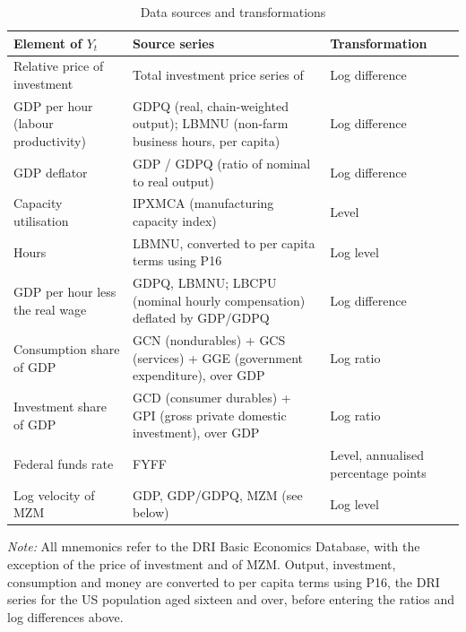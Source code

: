\documentclass[12pt, a4paper]{article}
\begin{document}
\begin{appendices}
\begin{table}[htpb]
    \centering
    \small
    \renewcommand{\arraystretch}{1.3}
    \caption{Data sources and transformations}
    \label{tab:data_sources}
    \begin{tabularx}{\linewidth}{p{3.3cm}Xp{3.1cm}}
    \toprule
    \textbf{Element of $Y_t$} & \textbf{Source series} & \textbf{Transformation} \\
    \midrule
    Relative price of investment & Total investment price series of \citet{Fisher2006} & Log difference \\
    GDP per hour (labour productivity) & GDPQ (real, chain-weighted output); LBMNU (non-farm business hours, per capita) & Log difference \\
    GDP deflator & GDP / GDPQ (ratio of nominal to real output) & Log difference \\
    Capacity utilisation & IPXMCA (manufacturing capacity index) & Level \\
    Hours & LBMNU, converted to per capita terms using P16 & Log level \\
    GDP per hour less the real wage & GDPQ, LBMNU; LBCPU (nominal hourly compensation) deflated by GDP/GDPQ & Log difference \\
    Consumption share of GDP & GCN (nondurables) + GCS (services) + GGE (government expenditure), over GDP & Log ratio \\
    Investment share of GDP & GCD (consumer durables) + GPI (gross private domestic investment), over GDP & Log ratio \\
    Federal funds rate & FYFF & Level, annualised percentage points \\
    Log velocity of MZM & GDP, GDP/GDPQ, MZM (see below) & Log level \\
    \bottomrule
    \end{tabularx}

    \vspace{0.2cm}
    \raggedright
    \scriptsize{\textit{Note:} All mnemonics refer to the DRI Basic Economics Database, with the
    exception of the price of investment and of MZM. Output, investment, consumption and money
    are converted to per capita terms using P16, the DRI series for the US population aged
    sixteen and over, before entering the ratios and log differences above.}
\end{table}


\end{appendices}
\end{document}
